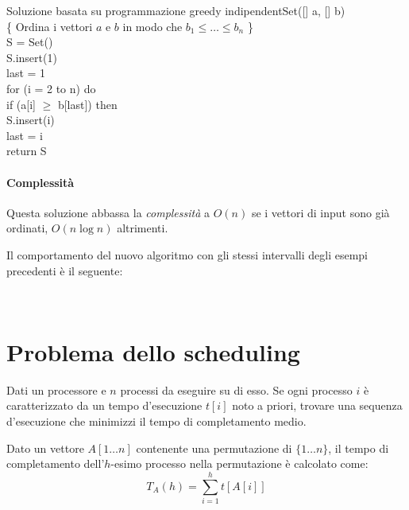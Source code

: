 \begin{minicode}{Soluzione basata su programmazione greedy}
\ind{} indipendentSet([] a, [] b)\\
    \{ Ordina i vettori $a$ e $b$ in modo che $b_1\leq\dots\leq b_n$ \}\\
     S = Set()\\
    S.insert(1)\\
     last = 1\\
    \indf for (i = 2 to n) do\\
        \indff if (a[i] $\geq$ b[last]) then\\
            S.insert(i)\\
            last = i\\
    \indf return S
\end{minicode}

\paragraph{Complessità}
Questa soluzione abbassa la \emph{complessità} a $O(n)$ se i vettori di input
sono già ordinati, $O(n\log n)$ altrimenti.

\begin{eg}
    Il comportamento del nuovo algoritmo con gli stessi intervalli degli esempi
    precedenti è il seguente:

    \begin{figure}[h!]
        \centering
        \hfill
        \\
        \hfill
    \end{figure}
\end{eg}

\section{Problema dello scheduling}
\begin{problem}
    Dati un processore e $n$ processi da eseguire su di esso. Se ogni processo $i$
    è caratterizzato da un tempo d'esecuzione $t[i]$ noto a priori, trovare una
    sequenza d'esecuzione che minimizzi il tempo di completamento medio.
\end{problem}
\begin{definition}
    Dato un vettore $A[1\dots n]$ contenente una permutazione di $\{1\dots n\}$,
    il tempo di completamento dell'$h$-esimo processo nella permutazione è
    calcolato come:
    \[T_A(h)=\sum_{i=1}^h t[A[i]]\]
\end{definition}

